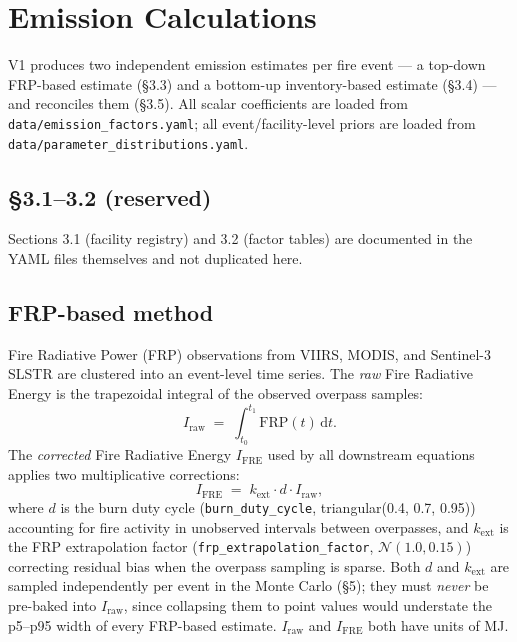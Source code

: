 \documentclass[11pt]{article}
\begin{document}
\section{Emission Calculations}

V1 produces two independent emission estimates per fire event --- a top-down
FRP-based estimate (\S3.3) and a bottom-up inventory-based estimate
(\S3.4) --- and reconciles them (\S3.5). All scalar coefficients are loaded
from \texttt{data/emission\_factors.yaml}; all event/facility-level priors
are loaded from \texttt{data/parameter\_distributions.yaml}.

\subsection*{\S3.1--3.2 (reserved)}
Sections 3.1 (facility registry) and 3.2 (factor tables) are documented in
the YAML files themselves and not duplicated here.

\subsection{FRP-based method}
\label{sec:frp}

Fire Radiative Power (FRP) observations from VIIRS, MODIS, and Sentinel-3
SLSTR are clustered into an event-level time series. The \emph{raw} Fire
Radiative Energy is the trapezoidal integral of the observed overpass
samples:
\begin{equation}
I_{\mathrm{raw}} \;=\; \int_{t_0}^{t_1} \mathrm{FRP}(t)\,\mathrm{d}t.
\label{eq:fre-raw}
\end{equation}
The \emph{corrected} Fire Radiative Energy $I_{\mathrm{FRE}}$ used by all
downstream equations applies two multiplicative corrections:
\begin{equation}
I_{\mathrm{FRE}} \;=\; k_{\mathrm{ext}} \cdot d \cdot I_{\mathrm{raw}},
\label{eq:fre}
\end{equation}
where $d$ is the burn duty cycle (\texttt{burn\_duty\_cycle},
triangular(0.4, 0.7, 0.95)) accounting for fire activity in unobserved
intervals between overpasses, and $k_{\mathrm{ext}}$ is the FRP
extrapolation factor (\texttt{frp\_extrapolation\_factor},
$\mathcal{N}(1.0, 0.15)$) correcting residual bias when the overpass
sampling is sparse. Both $d$ and $k_{\mathrm{ext}}$ are sampled
independently per event in the Monte Carlo (\S5); they must \emph{never}
be pre-baked into $I_{\mathrm{raw}}$, since collapsing them to point
values would understate the p5--p95 width of every FRP-based estimate.
$I_{\mathrm{raw}}$ and $I_{\mathrm{FRE}}$ both have units of MJ.
\end{document}
